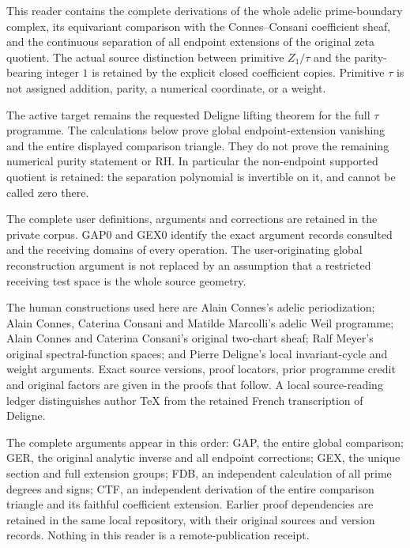 This reader contains the complete derivations of the whole adelic
prime-boundary complex, its equivariant comparison with the
Connes--Consani coefficient sheaf, and the continuous separation of all
endpoint extensions of the original zeta quotient. The actual source
distinction between primitive \(Z_1/\tau\) and the parity-bearing
integer \(1\) is retained by the explicit closed coefficient copies.
Primitive \(\tau\) is not assigned addition, parity, a numerical
coordinate, or a weight.

The active target remains the requested Deligne lifting theorem for the
full \(\tau\) programme. The calculations below prove global
endpoint-extension vanishing and the entire displayed comparison
triangle. They do not prove the remaining numerical purity statement or
RH. In particular the non-endpoint supported quotient is retained: the
separation polynomial is invertible on it, and cannot be called zero
there.

The complete user definitions, arguments and corrections are retained in
the private corpus. GAP0 and GEX0 identify the exact argument records
consulted and the receiving domains of every operation. The
user-originating global reconstruction argument is not replaced by an
assumption that a restricted receiving test space is the whole source
geometry.

The human constructions used here are Alain Connes's adelic
periodization; Alain Connes, Caterina Consani and Matilde Marcolli's
adelic Weil programme; Alain Connes and Caterina Consani's original
two-chart sheaf; Ralf Meyer's original spectral-function spaces; and
Pierre Deligne's local invariant-cycle and weight arguments. Exact
source versions, proof locators, prior programme credit and original
factors are given in the proofs that follow. A local source-reading
ledger distinguishes author TeX from the retained French transcription
of Deligne.

The complete arguments appear in this order: GAP, the entire global
comparison; GER, the original analytic inverse and all endpoint
corrections; GEX, the unique section and full extension groups; FDB, an
independent calculation of all prime degrees and signs; CTF, an
independent derivation of the entire comparison triangle and its
faithful coefficient extension. Earlier proof dependencies are retained
in the same local repository, with their original sources and version
records. Nothing in this reader is a remote-publication receipt.

\newpage

